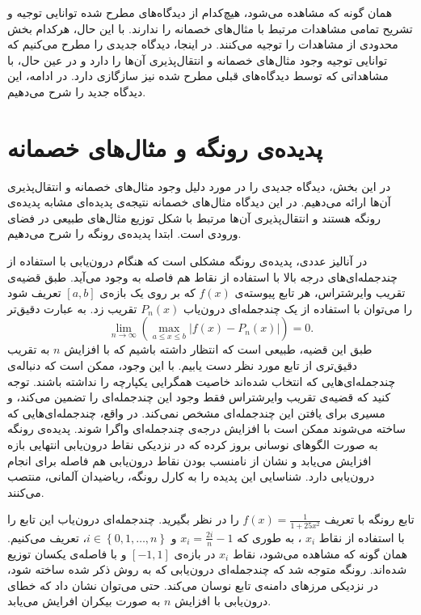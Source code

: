 \documentclass[12pt,onecolumn,a4paper]{article}
\begin{document}
همان گونه که مشاهده می‌شود، هیچ‌کدام از دیدگاه‌های مطرح شده توانایی توجیه و تشریح تمامی مشاهدات مرتبط با مثال‌های خصمانه را ندارند. با این حال، هرکدام بخش محدودی از مشاهدات را توجیه می‌کنند. در اینجا، دیدگاه جدیدی را مطرح می‌کنیم که توانایی توجیه وجود مثال‌های خصمانه و انتقال‌پذیری آن‌ها را دارد و  در عین حال، با مشاهداتی که توسط دیدگاه‌های قبلی مطرح شده نیز سازگازی دارد. در ادامه، این دیدگاه جدید را شرح می‌دهیم.

\section{پدیده‌ی رونگه و مثال‌های خصمانه}
در این بخش، دیدگاه جدیدی را در مورد دلیل وجود مثال‌های خصمانه و انتقال‌پذیری آن‌ها ارائه می‌دهیم. در این دیدگاه مثال‌های خصمانه نتیجه‌ی پدیده‌ای مشابه پدیده‌ی رونگه هستند و انتقال‌پذیری آن‌ها مرتبط با شکل توزیع مثال‌های طبیعی در فضای ورودی است. ابتدا پدیده‌ی رونگه را شرح می‌دهیم.

در آنالیز عددی، پدیده‌ی رونگه مشکلی است که هنگام درون‌یابی با استفاده از چندجمله‌ای‌های درجه بالا با استفاده از نقاط هم فاصله به وجود می‌آید. طبق قضیه‌ی تقریب وایرشتراس،
هر تابع پیوسته‌ی 
$f(x)$
که بر روی یک بازه‌ی
$[a,b]$
تعریف شود را می‌توان با استفاده از یک چندجمله‌ای درون‌یاب
$P_n(x)$
تقریب زد. به عبارت دقیق‌تر
\begin{equation*}
    \lim_{n\rightarrow \infty}\left(\max _{{a\leq x\leq b}}\left|f(x)-P_{n}(x)\right|\right)=0.
\end{equation*}
طبق این قضیه، طبیعی است که انتظار داشته باشیم که با افزایش 
$n$
به تقریب دقیق‌تری از تابع مورد نظر دست یابیم. با این وجود، ممکن است که دنباله‌ی چندجمله‌ای‌هایی که انتخاب شده‌اند خاصیت همگرایی یکپارچه را نداشته باشند. توجه کنید که قضیه‌ی تقریب وایرشتراس فقط وجود این چندجمله‌ای را تضمین می‌کند، و مسیری برای یافتن این چندجمله‌ای مشخص نمی‌کند. در واقع، چندجمله‌ای‌هایی که ساخته می‌شوند ممکن است با افزایش درجه‌ی چندجمله‌ای واگرا شوند. پدیده‌ی رونگه به صورت الگوهای نوسانی بروز کرده که در نزدیکی نقاط درون‌یابی انتهایی بازه افزایش می‌یابد و نشان از نامنسب بودن نقاط درون‌یابی هم فاصله برای انجام درون‌یابی دارد. شناسایی این پدیده را به  کارل رونگه،
ریاضیدان آلمانی، منتصب می‌کنند.

تابع رونگه با تعریف 
$f(x)=\frac{1}{1+25x^2}$ 
را در نظر بگیرید. چندجمله‌ای درون‌یاب این تابع را با استفاده از نقاط 
$x_i$ 
، به طوری که
$x_{i}=\frac{2i}{n}-1$ 
و 
$i\in \left\{0,1,\dots ,n\right\}$،
تعریف می‌کنیم.
همان گونه که مشاهده می‌شود، نقاط 
$x_i$ 
در بازه‌ی 
$[-1,1]$ 
و با فاصله‌ی یکسان توزیع شده‌اند. رونگه متوجه شد که چندجمله‌ای درون‌یابی که به روش ذکر شده ساخته شود، در نزدیکی مرز‌های دامنه‌ی تابع نوسان می‌کند. حتی می‌توان نشان داد که خطای درون‌یابی با افزایش 
$n$ 
 به صورت بیکران افرایش می‌یابد.
\end{document}
